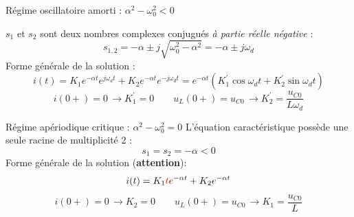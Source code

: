 \begin{frame}{Régime oscillatoire amorti : $\alpha^2 - \omega_0^2 < 0 $}

	$s_1$ et $s_2$ sont deux nombres complexes conjugués {\em à partie réelle négative}  :
	{\small \[s_{1,2}=-\alpha \pm j\sqrt{\omega_0^2-\alpha^2}= -\alpha \pm j\omega_d \]}
	Forme générale de la solution :
	{\small \[i(t)=K_1 e^{-\alpha t}e^{j\omega_d t} + K_2 e^{-\alpha t}e^{-j\omega_d t}
		= e^{-\alpha t}(K_1^{'}\cos \omega_d t + K_2^{'}\sin \omega_d t) \]}
	\[i(0+)=0 \, \rightarrow K_1^{'}=0 \qquad u_L(0+)=u_{C0}\, \rightarrow K_2^{'}=\frac{u_{C0}}{L\omega_d}\]
	\begin{center}
	\end{center}
\end{frame}



\begin{frame}{Régime apériodique critique : $\alpha^2 - \omega_0^2 = 0 $}	
	L'équation caractéristique possède une seule racine de multiplicité 2 :
	$$s_{1}=s_2=-\alpha < 0$$
	Forme générale de la solution (\textbf{attention}):
	$$i(t)=K_1 \mathcolor{red}{t} e^{-\alpha t}+K_2e^{-\alpha t}$$
	\[i(0+)=0 \, \rightarrow K_2=0 \qquad u_L(0+)=u_{C0}\, \rightarrow K_1=\frac{u_{C0}}{L}\]
	\begin{center}
	\end{center}
\end{frame}


